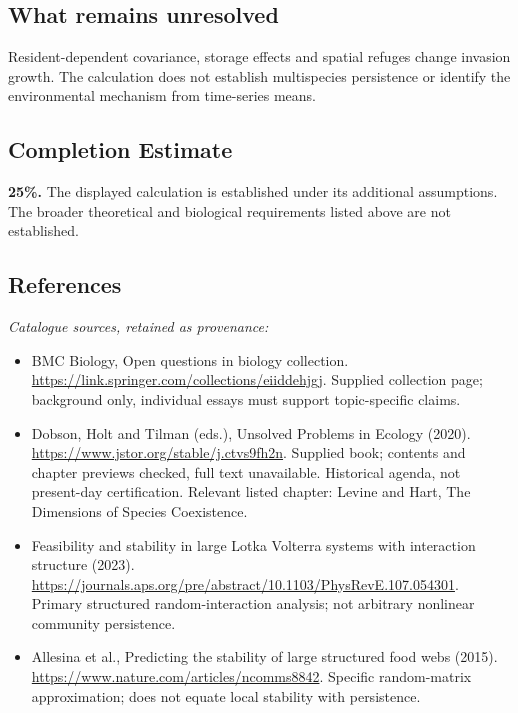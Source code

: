 \documentclass[11pt]{article}
\begin{document}
\subsection{What remains unresolved}
Resident-dependent covariance, storage effects and spatial refuges change invasion growth. The calculation does not establish multispecies persistence or identify the environmental mechanism from time-series means.
\subsection{Completion Estimate}
\textbf{25\%.} The displayed calculation is established under its additional assumptions. The broader theoretical and biological requirements listed above are not established.
\subsection{References}
\noindent\emph{Catalogue sources, retained as provenance:}
\begin{itemize}
\item BMC Biology, Open questions in biology collection. \url{https://link.springer.com/collections/eiiddehjgj}. Supplied collection page; background only, individual essays must support topic-specific claims.
\item Dobson, Holt and Tilman (eds.), Unsolved Problems in Ecology (2020). \url{https://www.jstor.org/stable/j.ctvs9fh2n}. Supplied book; contents and chapter previews checked, full text unavailable. Historical agenda, not present-day certification. Relevant listed chapter: Levine and Hart, The Dimensions of Species Coexistence.
\item Feasibility and stability in large Lotka Volterra systems with interaction structure (2023). \url{https://journals.aps.org/pre/abstract/10.1103/PhysRevE.107.054301}. Primary structured random-interaction analysis; not arbitrary nonlinear community persistence.
\item Allesina et al., Predicting the stability of large structured food webs (2015). \url{https://www.nature.com/articles/ncomms8842}. Specific random-matrix approximation; does not equate local stability with persistence.
\end{itemize}
\end{document}
